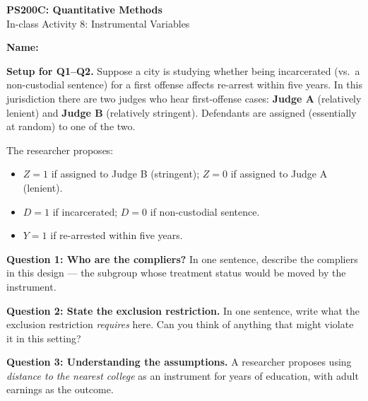 \documentclass[11pt]{article}
\begin{document}
\begin{center}
{\Large \textbf{PS200C: Quantitative Methods}} \\[6pt]
{\large In-class Activity 8: Instrumental Variables}
\end{center}

\vspace{4pt}
\noindent\textbf{Name:} \hrulefill

\vspace{12pt}

\begin{framed}
\noindent\textbf{Setup for Q1--Q2.}  Suppose a city is studying whether being incarcerated (vs.\ a non-custodial sentence) for a first offense affects re-arrest within five years.  In this jurisdiction there are two judges who hear first-offense cases: \textbf{Judge A} (relatively lenient) and \textbf{Judge B} (relatively stringent).  Defendants are assigned (essentially at random) to one of the two.

\medskip
The researcher proposes:
\begin{itemize}[itemsep=0pt, topsep=2pt]
\item $Z = 1$ if assigned to Judge B (stringent); $Z = 0$ if assigned to Judge A (lenient).
\item $D = 1$ if incarcerated; $D = 0$ if non-custodial sentence.
\item $Y = 1$ if re-arrested within five years.
\end{itemize}
\end{framed}

\vspace{6pt}

\noindent\textbf{Question 1: Who are the compliers?}  In one sentence, describe the compliers in this design --- the subgroup whose treatment status would be moved by the instrument.

\vspace{4cm}

\noindent\textbf{Question 2: State the exclusion restriction.}  In one sentence, write what the exclusion restriction \emph{requires} here.  Can you think of anything that might violate it in this setting?

\vspace{6cm}

\newpage

\noindent\textbf{Question 3: Understanding the assumptions.}  A researcher proposes using \textit{distance to the nearest college} as an instrument for years of education, with adult earnings as the outcome.
\end{document}
